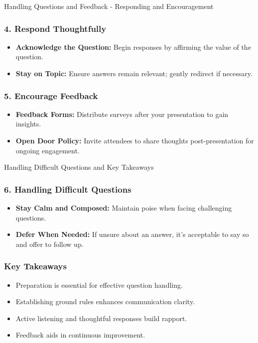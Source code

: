 \documentclass[aspectratio=169]{beamer}
\begin{document}
\begin{frame}[fragile]{Handling Questions and Feedback - Responding and Encouragement}
    \frametitle{4. Respond Thoughtfully}
    
    \begin{itemize}
        \item \textbf{Acknowledge the Question:} Begin responses by affirming the value of the question.
        
        \item \textbf{Stay on Topic:} Ensure answers remain relevant; gently redirect if necessary.
    \end{itemize}
    
    \vspace{0.5cm} %
    
    \frametitle{5. Encourage Feedback}
    
    \begin{itemize}
        \item \textbf{Feedback Forms:} Distribute surveys after your presentation to gain insights.
        
        \item \textbf{Open Door Policy:} Invite attendees to share thoughts post-presentation for ongoing engagement.
    \end{itemize}
\end{frame}

\begin{frame}[fragile]{Handling Difficult Questions and Key Takeaways}
    \frametitle{6. Handling Difficult Questions}
    
    \begin{itemize}
        \item \textbf{Stay Calm and Composed:} Maintain poise when facing challenging questions.
        
        \item \textbf{Defer When Needed:} If unsure about an answer, it's acceptable to say so and offer to follow up.
    \end{itemize}
    
    \vspace{0.5cm} %
    
    \frametitle{Key Takeaways}
    
    \begin{itemize}
        \item Preparation is essential for effective question handling.
        \item Establishing ground rules enhances communication clarity.
        \item Active listening and thoughtful responses build rapport.
        \item Feedback aids in continuous improvement.
    \end{itemize}
\end{frame}
\end{document}
